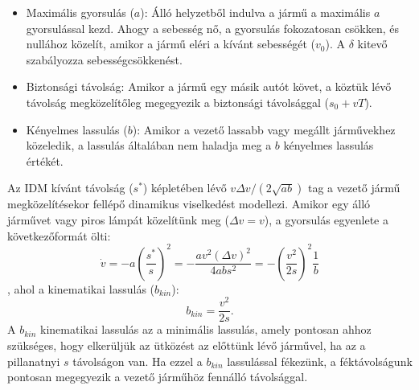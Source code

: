 \documentclass[14pt,a4paper]{extarticle}
\begin{document}
\begin{itemize}
	\item Maximális gyorsulás ($a$): Álló helyzetből indulva a jármű a maximális $a$ gyorsulással kezd. Ahogy a sebesség nő, a gyorsulás fokozatosan csökken, és nullához közelít, amikor a jármű eléri a kívánt sebességét (${v}_0$). A $\delta$ kitevő szabályozza sebességcsökkenést.
	\item Biztonsági távolság: Amikor a jármű egy másik autót követ, a köztük lévő távolság megközelítőleg megegyezik a biztonsági távolsággal (${s}_0 + vT$).
	\item Kényelmes lassulás ($b$): Amikor a vezető lassabb vagy megállt járművekhez közeledik, a lassulás általában nem haladja meg a $b$ kényelmes lassulás értékét.
\end{itemize}
Az IDM kívánt távolság ($s^*$) képletében lévő $v\Delta v / (2\sqrt{ab})$ tag a vezető jármű megközelítésekor fellépő dinamikus viselkedést modellezi. Amikor egy álló járművet vagy piros lámpát közelítünk meg ($\Delta v = v$), a gyorsulás egyenlete a következőformát ölti:
$$
\dot{v} = -a \left(\frac{s^*}{s}\right)^2 = - \frac{av^2(\Delta v)^2}{4abs^2} = - \left(\frac{v^2}{2s}\right)^2 \frac{1}{b}
$$
, ahol a kinematikai lassulás (${b}_{kin}$):
$$b_{kin} = \frac{v^2}{2s}. $$
A ${b}_{kin}$ kinematikai lassulás az a minimális lassulás, amely pontosan ahhoz szükséges, hogy elkerüljük az ütközést az előttünk lévő járművel, ha az a pillanatnyi ${s}$ távolságon van. Ha ezzel a ${b}_{kin}$ lassulással fékezünk, a féktávolságunk pontosan megegyezik a vezető járműhöz fennálló távolsággal.
\end{document}

